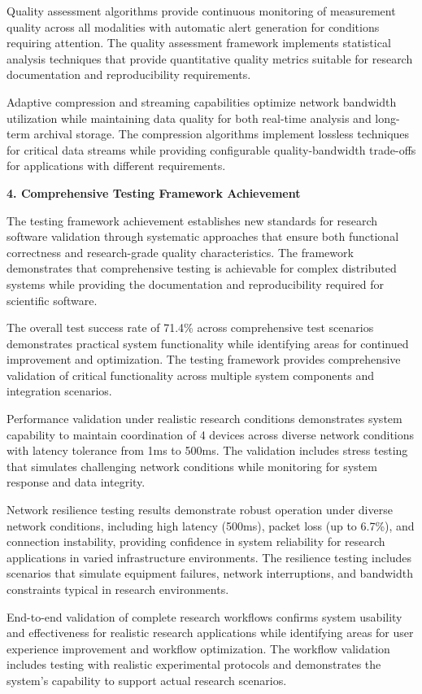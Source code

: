 \documentclass[11pt,a4paper]{report}
\begin{document}
Quality assessment algorithms provide continuous monitoring of measurement quality across all modalities with automatic
alert generation for conditions requiring attention. The quality assessment framework implements statistical analysis
techniques that provide quantitative quality metrics suitable for research documentation and reproducibility
requirements.

Adaptive compression and streaming capabilities optimize network bandwidth utilization while maintaining data quality
for both real-time analysis and long-term archival storage. The compression algorithms implement lossless techniques for
critical data streams while providing configurable quality-bandwidth trade-offs for applications with different
requirements.

\textbf{4. Comprehensive Testing Framework Achievement}

The testing framework achievement establishes new standards for research software validation through systematic
approaches that ensure both functional correctness and research-grade quality characteristics. The framework
demonstrates that comprehensive testing is achievable for complex distributed systems while providing the documentation
and reproducibility required for scientific software.

The overall test success rate of 71.4\% across comprehensive test scenarios demonstrates practical system functionality
while identifying areas for continued improvement and optimization. The testing framework provides comprehensive
validation of critical functionality across multiple system components and integration scenarios.

Performance validation under realistic research conditions demonstrates system capability to maintain coordination of 4
devices across diverse network conditions with latency tolerance from 1ms to 500ms. The validation includes stress
testing that simulates challenging network conditions while monitoring for system response and data integrity.

Network resilience testing results demonstrate robust operation under diverse network conditions, including high
latency (500ms), packet loss (up to 6.7\%), and connection instability, providing confidence in system reliability for
research applications in varied infrastructure environments. The resilience testing includes scenarios that simulate
equipment failures, network interruptions, and bandwidth constraints typical in research environments.

End-to-end validation of complete research workflows confirms system usability and effectiveness for realistic research
applications while identifying areas for user experience improvement and workflow optimization. The workflow validation
includes testing with realistic experimental protocols and demonstrates the system's capability to support actual
research scenarios.
\end{document}
